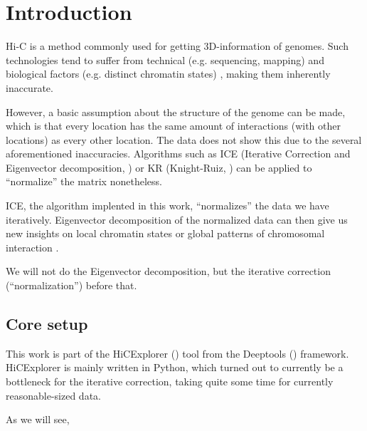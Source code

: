 \chapter{Introduction}\label{chap:introduction}

Hi-C is a method commonly used for getting 3D-information of genomes. Such
technologies tend to suffer from technical (e.g. sequencing, mapping)
\cite{pmid21646344} and biological factors (e.g. distinct chromatin states)
\cite{pmid19693276}, making them inherently inaccurate.

However, a basic assumption about the structure of the genome can be made,
which is that every location has the same amount of interactions (with other
locations) as every other location. The data does not show this due to the
several aforementioned inaccuracies. Algorithms such as ICE (Iterative
Correction and Eigenvector decomposition, ) or KR (Knight-Ruiz,
) can be applied to ``normalize'' the matrix nonetheless.

ICE, the algorithm implented in this work, ``normalizes'' the data we
have iteratively. Eigenvector decomposition of the normalized data can then
give us new insights on local chromatin states or global patterns of
chromosomal interaction \cite{imakaev2012iterative}.

We will not do the Eigenvector decomposition, but the iterative correction
(``normalization'') before that.


\section{Core setup}\label{sec:setup}

This work is part of the HiCExplorer () tool from the
Deeptools () framework. HiCExplorer is mainly written in
Python, which turned out to currently be a bottleneck for the iterative
correction, taking quite some time for currently reasonable-sized data.

As we will see, 




